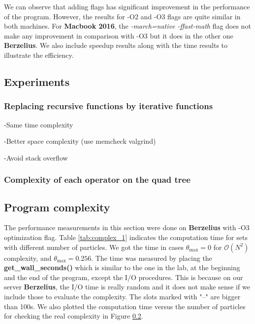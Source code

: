 \documentclass[12pt,oneside,a4paper]{article}
\begin{document}
We can observe that adding flags has significant improvement in the performance of the program. However, the results for \textsc{-O2} and \textsc{-O3} flags are quite similar in both machines. For \textbf{Macbook 2016}, the \textit{-march=native -ffast-math} flag does not make any improvement in comparison with \textsc{-O3} but it does in the other one \textbf{Berzelius}. We also include speedup results along with the time results to illustrate the efficiency.

\subsection{Experiments}

\subsubsection{Replacing recursive functions by iterative functions}
-Same time complexity

-Better space complexity (use memcheck valgrind)

-Avoid stack overflow

\subsubsection{Complexity of each operator on the quad tree}

\subsection{Program complexity}
The performance measurements in this section were done on \textbf{Berzelius} with \textsc{-O3} optimization flag. Table \ref{tab:complex_1} indicates the computation time for sets with different number of particles. We got the time in cases $\theta_{\max} = 0$ for $\mathcal{O} (N^2)$ complexity, and $\theta_{\max} = 0.256$. The time was measured by placing the \textbf{get\_wall\_seconds()} which is similar to the one in the lab, at the beginning and the end of the program, except the I/O procedures. This is because on our server \textbf{Berzelius}, the I/O time is really random and it does not make sense if we include those to evaluate the complexity. The slots marked with "--" are bigger than 100s. We also plotted the computation time versus the number of particles for checking the real complexity in Figure \ref{}.
\end{document}
